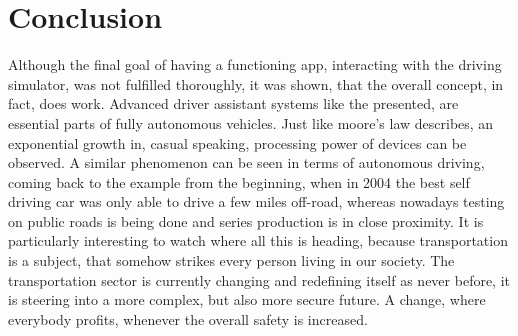 
\chapter{Conclusion}\label{chapter:conclusion}
Although the final goal of having a functioning app, interacting with the driving simulator, was not fulfilled thoroughly, it was shown, that the overall concept, in fact, does work. Advanced driver assistant systems like the presented, are essential parts of fully autonomous vehicles. Just like moore's law describes, an exponential growth in, casual speaking, processing power of devices can be observed. A similar phenomenon can be seen in terms of autonomous driving, coming back to the example from the beginning, when in 2004 the best self driving car was only able to drive a few miles off-road, whereas nowadays testing on public roads is being done and series production is in close proximity. It is particularly interesting to watch where all this is heading, because transportation is a subject, that somehow strikes every person living in our society. The transportation sector is currently changing and redefining itself as never before, it is steering into a more complex, but also more secure future. A change, where everybody profits, whenever the overall safety is increased. 